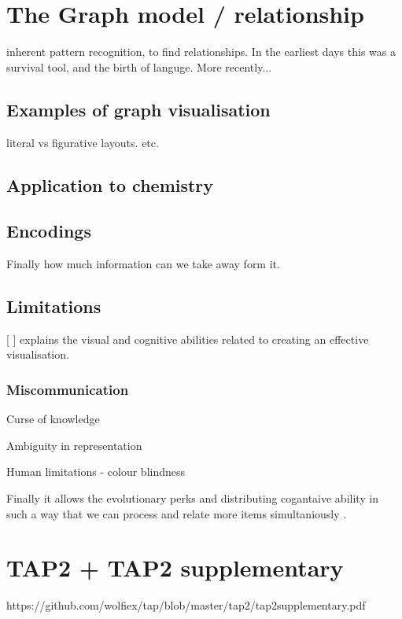 

\section{The Graph model / relationship}

inherent pattern recognition, to find relationships. In the earliest days this was a survival tool, and the birth of languge. More recently... 


\subsection{Examples of graph visualisation }
literal vs figurative layouts. etc. 

\subsection{Application to chemistry}

\newpage


\subsection{Encodings}

Finally how much information can we take away form it. 

\subsection{Limitations}
[ ] explains the visual and cognitive abilities related to creating an effective visualisation. 



\subsubsection{Miscommunication}

Curse of knowledge

Ambiguity in representation

Human limitations - colour blindness 


Finally it allows the evolutionary perks and distributing cogantaive ability in such a way that we can process and relate more items simultaniously . 

\section{TAP2 + TAP2 supplementary}
https://github.com/wolfiex/tap/blob/master/tap2/tap2supplementary.pdf

